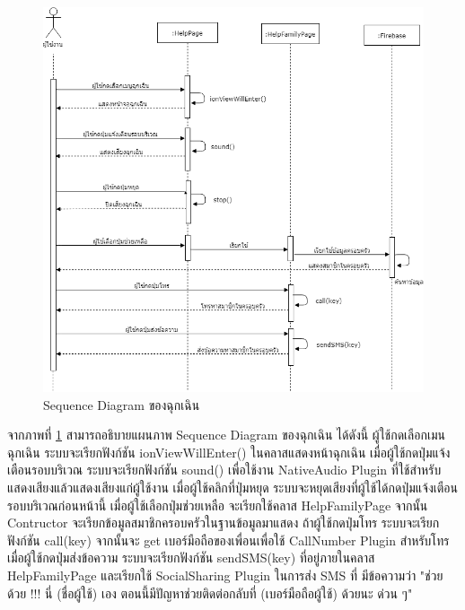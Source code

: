 \begin{figure}[H]
	\centering
	\includegraphics[width=1.0\columnwidth]
	{Figures/3/Sequence/danger}
	\caption{Sequence Diagram ของฉุกเฉิน}
	\label{Fig:Sequence-danger}
\end{figure}

\newpage
จากภาพที่ \ref{Fig:Sequence-danger} สามารถอธิบายแผนภาพ Sequence Diagram ของฉุกเฉิน ได้ดังนี้ 
ผู้ใช้กดเลือกเมนฉุกเฉิน ระบบจะเรียกฟังก์ชัน ionViewWillEnter() ในคลาสแสดงหน้าฉุกเฉิน เมื่อผู้ใช้กดปุ่มแจ้งเตือนรอบบริเวณ ระบบจะเรียกฟังก์ชัน sound() เพื่อใช้งาน NativeAudio Plugin ที่ใช้สำหรับแสดงเสียงแล้วแสดงเสียงแก่ผู้ใช้งาน 
เมื่อผู้ใช้คลิกที่ปุ่มหยุด ระบบจะหยุดเสียงที่ผู้ใช้ได้กดปุ่มแจ้งเตือนรอบบริเวณก่อนหน้านี้ เมื่อผู้ใช้เลือกปุ่มช่วยเหลือ จะเรียกใช้คลาส HelpFamilyPage จากนั้น Contructor จะเรียกข้อมูลสมาชิกครอบครัวในฐานข้อมูลมาแสดง 
ถ้าผู้ใช้กดปุ่มโทร ระบบจะเรียกฟังก์ชัน call(key) จากนั้นจะ get เบอร์มือถือของเพื่อนเพื่อใช้ CallNumber Plugin สำหรับโทร เมื่อผู้ใช้กดปุ่มส่งข้อความ ระบบจะเรียกฟังก์ชัน sendSMS(key) ที่อยู่ภายในคลาส HelpFamilyPage และเรียกใช้ SocialSharing Plugin ในการส่ง SMS ที่
มีข้อความว่า "ช่วยด้วย !!! นี่ (ชื่อผู้ใช้) เอง ตอนนี้มีปัญหาช่วยติดต่อกลับที่ (เบอร์มือถือผู้ใช้) ด้วยนะ ด่วน ๆ"
\newpage

	

